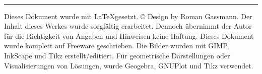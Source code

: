 % 
% 
% 
% 
%


\pagestyle{empty}
	\begin{center}
		\phantom{bu}\vspace{7cm}
		\flushright{\sf \Huge \textbf{\titel} }\\
		\vspace{0.3cm} 
		\color{CadetRed} \hspace*{-30pt}\rule[7pt]{\textwidth+55pt}{0.5pt}
       	\color{black}
		\vspace{2cm}
	\end{center}

	\begin{center}
	\sf \Huge \vspace{2cm}
		\newpage
		\vspace*{22cm}
		\scriptsize
		 \color{black}
		\begin{minipage}{\textwidth}
			Dieses Dokument wurde mit \LaTeX gesetzt.\newline
			\textnormal{\copyright} Design by Roman Gassmann.\newline
			Der Inhalt dieses Werkes wurde sorgfältig erarbeitet. Dennoch übernimmt der Autor für die Richtigkeit von Angaben und Hinweisen keine Haftung.\newline
			Dieses Dokument wurde komplett auf Freeware geschrieben.
			Die Bilder wurden mit GIMP, InkScape und Tikz erstellt/editiert. 
			Für geometrische Darstellungen oder Visualisierungen von Lösungen, wurde Geogebra, GNUPlot und Tikz verwendet.
		\end{minipage}

	\end{center}

